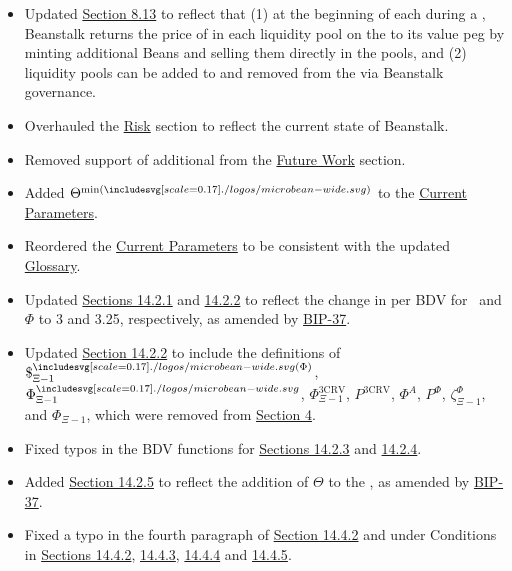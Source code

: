 \documentclass[class=article, crop=false]{standalone}
\begin{document}
\begin{itemize}[topsep=0pt, itemsep=3pt,leftmargin=16pt]
\begin{itemize}
        \item Updated \hyperlink{subsection.8.13}{Section 8.13} to reflect that (1) at the beginning of each  during a , Beanstalk returns the price of  in each liquidity pool on the  to its value peg by minting additional Beans and selling them directly in the pools, and (2) liquidity pools can be added to and removed from the  via Beanstalk governance.
        \item Overhauled the \hyperlink{section.12}{Risk} section to reflect the current state of Beanstalk.
        \item Removed support of additional  from the \hyperlink{section.13}{Future Work} section.
        \item Added $\Theta^{\text{min}(\bean)}$ to the \hyperlink{subsection.14.1}{Current Parameters}.
        \item Reordered the \hyperlink{subsection.14.1}{Current Parameters} to be consistent with the updated  \hyperlink{subsection.14.11}{Glossary}.
        \item Updated \hyperlink{subsubsection.14.2.1}{Sections 14.2.1} and \hyperlink{subsubsection.14.2.2}{14.2.2} to reflect the change in  per BDV for \Bean\ and $\Phi$ to 3 and 3.25, respectively, as amended by \href{https://bean.money/bip-37}{BIP-37}.
        \item Updated \hyperlink{subsubsection.14.2.2}{Section 14.2.2} to include the definitions of \hyperlink{ht3}{$\$^{\bean(\Phi)}_{\Xi-1}$}, \hyperlink{ht193}{$\Phi_{\Xi-1}^{\bean}$}, \hyperlink{ht194}{$\Phi_{\Xi-1}^{\text{3CRV}}$}, \hyperlink{ht136}{$P^{\text{3CRV}}$}, \hyperlink{ht190}{$\Phi^{A}$}, \hyperlink{ht140}{$P^{\Phi}$}, \hyperlink{ht96}{$\zeta^{\Phi}_{\Xi-1}$}, and \hyperlink{ht192}{$\Phi_{\Xi-1}$}, which were removed from \hyperlink{section.4}{Section 4}.
        \item Fixed typos in the BDV functions for \hyperlink{subsubsection.14.2.3}{Sections 14.2.3} and \hyperlink{subsubsection.14.2.3}{14.2.4}.
        \item Added \hyperlink{subsubsection.14.2.5}{Section 14.2.5} to reflect the addition of $\Theta$ to the , as amended by \href{https://bean.money/bip-37}{BIP-37}.
        \item Fixed a typo in the fourth paragraph of \hyperlink{subsubsection.14.4.2}{Section 14.4.2} and under Conditions in \hyperlink{subsubsection.14.4.2}{Sections 14.4.2}, \hyperlink{subsubsection.14.4.3}{14.4.3}, \hyperlink{subsubsection.14.4.4}{14.4.4} and \hyperlink{subsubsection.14.4.5}{14.4.5}.

\end{itemize}
\end{itemize}
\end{document}
